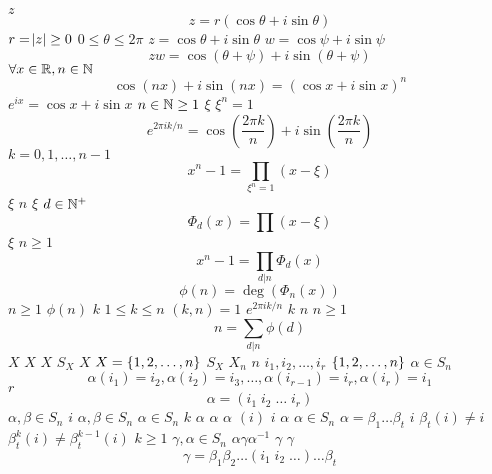 \documentclass{article}
\begin{document}
$z$
\begin{equation*}
   z=r(\cos\theta+i\sin\theta)
   \end{equation*}
$r=\abs{z}\ge0$
$0\le\theta\le 2\pi$
$z=\cos\theta+i\sin\theta$
$w=\cos\psi+i\sin\psi$
\begin{equation*}
   zw=\cos(\theta+\psi)+i\sin(\theta+\psi)
   \end{equation*}
$\forall x\in\mathbb{R},n\in\mathbb{N}$
\begin{equation*}
   \cos(nx)+i\sin(nx)=(\cos x+i\sin x)^n
   \end{equation*}
$e^{ix}=\cos x+i\sin x$
$n\in\mathbb{N}\ge 1$
$\xi$
$\xi^n=1$
\begin{equation*}
   e^{2\pi ik/n}=\cos(\frac{2\pi k}{n})+i\sin(\frac{2\pi k}{n})
   \end{equation*}
$k=0,1,\dots,n-1$
\begin{equation*}
   x^n-1=\displaystyle\prod_{\xi^n=1}(x-\xi)
   \end{equation*}
$\xi$
$n$
$\xi$
$d\in\mathbb{N}^+$
\begin{equation*}
   \Phi_d(x)=\displaystyle\prod(x-\xi)
   \end{equation*}
$\xi$
$n\ge 1$
\begin{equation*}
   x^n-1=\displaystyle\prod_{d|n}\Phi_d(x)
   \end{equation*}
\begin{equation*}
   \phi(n)=\deg(\Phi_n(x))
   \end{equation*}
$n\ge1$
$\phi(n)$
$k$
$1\le k\le n$
$(k,n)=1$
$e^{2\pi ik/n}$
$k$
$n$
$n\ge 1$
\begin{equation*}
   n=\displaystyle\sum_{d|n}\phi(d)
   \end{equation*}
$X$
$X$
$X$
$S_X$
$X$
$X=\left\{ 1,2,\dots,n\right\}$
$S_X$
$X_n$
$n$
$i_1,i_2,\dots,i_r$
$\left\{ 1,2,\dots,n\right\}$
$\alpha\in S_n$
\begin{equation*}
   \alpha(i_1)=i_2,\alpha(i_2)=i_3,\dots,\alpha(i_{r-1})=i_r,\alpha(i_r)=i_1
   \end{equation*}
$r$
\begin{equation*}
   \alpha=(i_1\; i_2\;\dots\; i_r)
   \end{equation*}
$\alpha,\beta\in S_n$
$i$
$\alpha,\beta\in S_n$
$\alpha\in S_n$
$k$
$\alpha$
$\alpha$
$\alpha$
$(i)$
$i$
$\alpha$
$\alpha\in S_n$
$\alpha=\beta_1\dots\beta_t$
$i$
$\beta_t(i)\neq i$
$\beta_t^k(i)\neq\beta_t^{k-1}(i)$
$k\ge 1$
$\gamma,\alpha\in S_n$
$\alpha\gamma\alpha^{-1}$
$\gamma$
$\gamma$
\begin{equation*}
   \gamma=\beta_1\beta_2\dots(i_1\; i_2\;\dots)\dots\beta_t
   \end{equation*}
\end{document}
